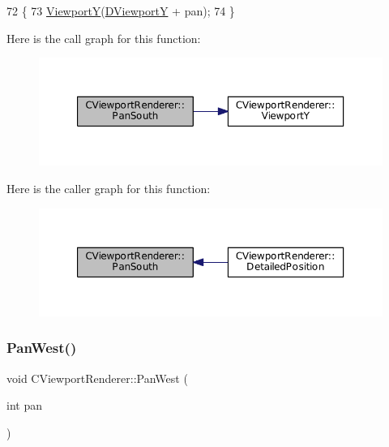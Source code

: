 \begin{DoxyCode}
72                                        \{
73     \hyperlink{classCViewportRenderer_add3d4da286927abe2f19fbb37fd42ed5}{ViewportY}(\hyperlink{classCViewportRenderer_ae13dd437a3da3d2bab16bc7ba61cb78f}{DViewportY} + pan);
74 \}
\end{DoxyCode}
Here is the call graph for this function\+:
\nopagebreak
\begin{figure}[H]
\begin{center}
\leavevmode
\includegraphics[width=350pt]{classCViewportRenderer_ad4aa68d96923dbea1bfd9ae3f23a3132_cgraph}
\end{center}
\end{figure}
Here is the caller graph for this function\+:
\nopagebreak
\begin{figure}[H]
\begin{center}
\leavevmode
\includegraphics[width=350pt]{classCViewportRenderer_ad4aa68d96923dbea1bfd9ae3f23a3132_icgraph}
\end{center}
\end{figure}
\hypertarget{classCViewportRenderer_aa09c1b984311f77ea1cdcdc74a7a0316}{}\label{classCViewportRenderer_aa09c1b984311f77ea1cdcdc74a7a0316} 
\subsubsection{\texorpdfstring{Pan\+West()}{PanWest()}}
{\footnotesize\ttfamily void C\+Viewport\+Renderer\+::\+Pan\+West (\begin{DoxyParamCaption}\item[{int}]{pan }\end{DoxyParamCaption})}



